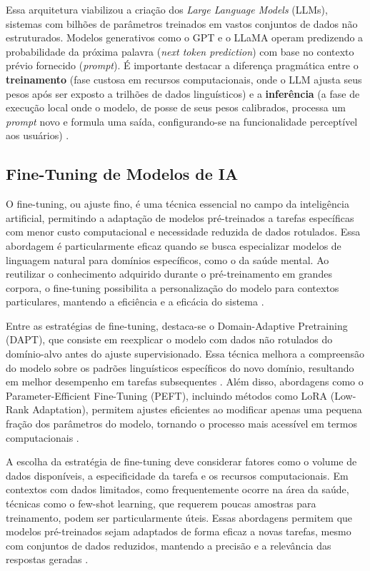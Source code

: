 Essa arquitetura viabilizou a criação dos \textit{Large Language Models} (LLMs), sistemas com bilhões de parâmetros treinados em vastos conjuntos de dados não estruturados. Modelos generativos como o GPT e o LLaMA operam predizendo a probabilidade da próxima palavra (\textit{next token prediction}) com base no contexto prévio fornecido (\textit{prompt}). É importante destacar a diferença pragmática entre o \textbf{treinamento} (fase custosa em recursos computacionais, onde o LLM ajusta seus pesos após ser exposto a trilhões de dados linguísticos) e a \textbf{inferência} (a fase de execução local onde o modelo, de posse de seus pesos calibrados, processa um \textit{prompt} novo e formula uma saída, configurando-se na funcionalidade perceptível aos usuários) \cite{touroude2023llama}.

\subsection{Fine-Tuning de Modelos de IA}

O fine-tuning, ou ajuste fino, é uma técnica essencial no campo da inteligência artificial, permitindo a adaptação de modelos pré-treinados a tarefas específicas com menor custo computacional e necessidade reduzida de dados rotulados. Essa abordagem é particularmente eficaz quando se busca especializar modelos de linguagem natural para domínios específicos, como o da saúde mental. Ao reutilizar o conhecimento adquirido durante o pré-treinamento em grandes corpora, o fine-tuning possibilita a personalização do modelo para contextos particulares, mantendo a eficiência e a eficácia do sistema \cite{ibm2023o}.

Entre as estratégias de fine-tuning, destaca-se o Domain-Adaptive Pretraining (DAPT), que consiste em reexplicar o modelo com dados não rotulados do domínio-alvo antes do ajuste supervisionado. Essa técnica melhora a compreensão do modelo sobre os padrões linguísticos específicos do novo domínio, resultando em melhor desempenho em tarefas subsequentes \cite{araujo2025fine}. Além disso, abordagens como o Parameter-Efficient Fine-Tuning (PEFT), incluindo métodos como LoRA (Low-Rank Adaptation), permitem ajustes eficientes ao modificar apenas uma pequena fração dos parâmetros do modelo, tornando o processo mais acessível em termos computacionais \cite{magalhaes2024entendendo}.

A escolha da estratégia de fine-tuning deve considerar fatores como o volume de dados disponíveis, a especificidade da tarefa e os recursos computacionais. Em contextos com dados limitados, como frequentemente ocorre na área da saúde, técnicas como o few-shot learning, que requerem poucas amostras para treinamento, podem ser particularmente úteis. Essas abordagens permitem que modelos pré-treinados sejam adaptados de forma eficaz a novas tarefas, mesmo com conjuntos de dados reduzidos, mantendo a precisão e a relevância das respostas geradas \cite{ibm2023o}.

